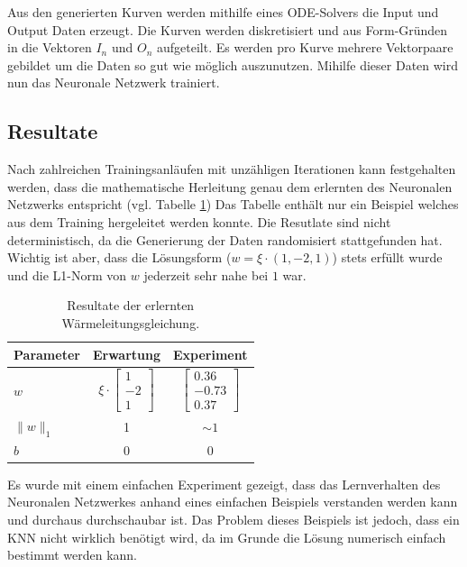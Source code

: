 Aus den generierten Kurven werden mithilfe eines ODE-Solvers die Input und Output Daten erzeugt. Die Kurven werden diskretisiert und aus Form-Gründen in die Vektoren $I_n$ und $O_n$ aufgeteilt. Es werden pro Kurve mehrere Vektorpaare gebildet um die Daten so gut wie möglich auszunutzen. Mihilfe dieser Daten wird nun das Neuronale Netzwerk trainiert.

\subsection{Resultate}
Nach zahlreichen Trainingsanläufen mit unzähligen Iterationen kann festgehalten werden, dass die mathematische Herleitung genau dem erlernten des Neuronalen Netzwerks entspricht (vgl. Tabelle \ref{tbl:result_heat}) Das Tabelle enthält nur ein Beispiel welches aus dem Training hergeleitet werden konnte. Die Resutlate sind nicht deterministisch, da die Generierung der Daten randomisiert stattgefunden hat. Wichtig ist aber, dass die Lösungsform ($w = \xi \cdot (1, -2, 1)$) stets erfüllt wurde und die L1-Norm von $w$ jederzeit sehr nahe bei $1$ war.

\begin{table}[h]
	\centering
	\def\arraystretch{1.1}
	\begin{tabular}{l|c|c}
		Parameter & Erwartung & Experiment \\
		\hline
		$w$ & $\xi \cdot \begin{bmatrix} 1 \\ -2 \\ 1 \end{bmatrix}$ & $\begin{bmatrix} 0.36 \\ -0.73 \\ 0.37 \end{bmatrix}$ \\
		$\|w\|_{1}$ & 1 & $\sim 1$ \\
		$b$ & 0 & 0 \\
	\end{tabular}
	\label{tbl:result_heat}
	\caption{Resultate der erlernten Wärmeleitungsgleichung.}
\end{table}

Es wurde mit einem einfachen Experiment gezeigt, dass das Lernverhalten des Neuronalen Netzwerkes anhand eines einfachen Beispiels verstanden werden kann und durchaus durchschaubar ist. Das Problem dieses Beispiels ist jedoch, dass ein KNN nicht wirklich benötigt wird, da im Grunde die Lösung numerisch einfach bestimmt werden kann.